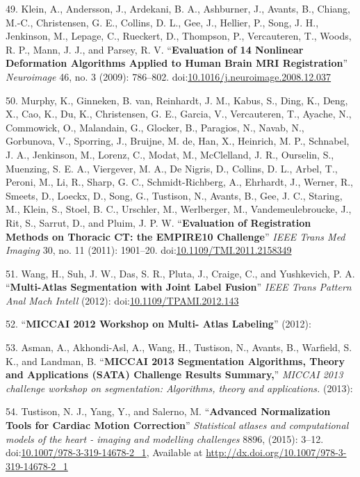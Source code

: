 \documentclass[11pt,]{article}
\begin{document}
49. Klein, A., Andersson, J., Ardekani, B. A., Ashburner, J., Avants,
B., Chiang, M.-C., Christensen, G. E., Collins, D. L., Gee, J., Hellier,
P., Song, J. H., Jenkinson, M., Lepage, C., Rueckert, D., Thompson, P.,
Vercauteren, T., Woods, R. P., Mann, J. J., and Parsey, R. V.
``\textbf{Evaluation of 14 Nonlinear Deformation Algorithms Applied to
Human Brain MRI Registration}'' \emph{Neuroimage} 46, no. 3 (2009):
786--802.
doi:\href{http://dx.doi.org/10.1016/j.neuroimage.2008.12.037}{10.1016/j.neuroimage.2008.12.037}

50. Murphy, K., Ginneken, B. van, Reinhardt, J. M., Kabus, S., Ding, K.,
Deng, X., Cao, K., Du, K., Christensen, G. E., Garcia, V., Vercauteren,
T., Ayache, N., Commowick, O., Malandain, G., Glocker, B., Paragios, N.,
Navab, N., Gorbunova, V., Sporring, J., Bruijne, M. de, Han, X.,
Heinrich, M. P., Schnabel, J. A., Jenkinson, M., Lorenz, C., Modat, M.,
McClelland, J. R., Ourselin, S., Muenzing, S. E. A., Viergever, M. A.,
De Nigris, D., Collins, D. L., Arbel, T., Peroni, M., Li, R., Sharp, G.
C., Schmidt-Richberg, A., Ehrhardt, J., Werner, R., Smeets, D., Loeckx,
D., Song, G., Tustison, N., Avants, B., Gee, J. C., Staring, M., Klein,
S., Stoel, B. C., Urschler, M., Werlberger, M., Vandemeulebroucke, J.,
Rit, S., Sarrut, D., and Pluim, J. P. W. ``\textbf{Evaluation of
Registration Methods on Thoracic CT: the EMPIRE10 Challenge}''
\emph{IEEE Trans Med Imaging} 30, no. 11 (2011): 1901--20.
doi:\href{http://dx.doi.org/10.1109/TMI.2011.2158349}{10.1109/TMI.2011.2158349}

51. Wang, H., Suh, J. W., Das, S. R., Pluta, J., Craige, C., and
Yushkevich, P. A. ``\textbf{Multi-Atlas Segmentation with Joint Label
Fusion}'' \emph{IEEE Trans Pattern Anal Mach Intell} (2012):
doi:\href{http://dx.doi.org/10.1109/TPAMI.2012.143}{10.1109/TPAMI.2012.143}

52. ``\textbf{MICCAI 2012 Workshop on Multi- Atlas Labeling}'' (2012):

53. Asman, A., Akhondi-Asl, A., Wang, H., Tustison, N., Avants, B.,
Warfield, S. K., and Landman, B. ``\textbf{MICCAI 2013 Segmentation
Algorithms, Theory and Applications (SATA) Challenge Results Summary,}''
\emph{MICCAI 2013 challenge workshop on segmentation: Algorithms, theory
and applications.} (2013):

54. Tustison, N. J., Yang, Y., and Salerno, M. ``\textbf{Advanced
Normalization Tools for Cardiac Motion Correction}'' \emph{Statistical
atlases and computational models of the heart - imaging and modelling
challenges} 8896, (2015): 3--12.
doi:\href{http://dx.doi.org/10.1007/978-3-319-14678-2_1}{10.1007/978-3-319-14678-2\_1},
Available at \url{http://dx.doi.org/10.1007/978-3-319-14678-2_1}
\end{document}
